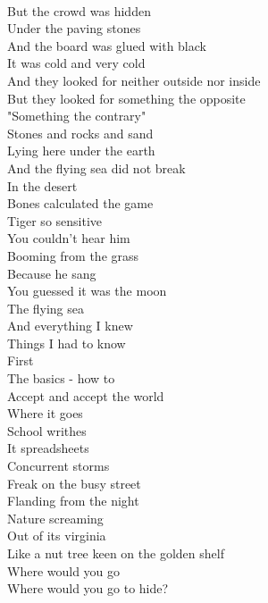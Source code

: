 \documentclass[smalldemyvopaper,11pt,twoside,onecolumn,openright,extrafontsizes]{memoir}
\begin{document}
\\But the crowd was hidden
\\Under the paving stones
\\And the board was glued with black
\\It was cold and very cold
\\And they looked for neither outside nor inside
\\But they looked for something the opposite
\\"Something the contrary"
\\Stones and rocks and sand
\\Lying here under the earth
\\And the flying sea did not break
\\In the desert
\\Bones calculated the game
\\Tiger so sensitive
\\You couldn't hear him
\\Booming from the grass
\\Because he sang
\\You guessed it was the moon
\\The flying sea
\\And everything I knew
\\Things I had to know
\\First
\\The basics - how to
\\Accept and accept the world
\\Where it goes
\\School writhes
\\It spreadsheets
\\Concurrent storms
\\Freak on the busy street
\\Flanding from the night
\\Nature screaming
\\Out of its virginia
\\Like a nut tree keen on the golden shelf
\\Where would you go
\\Where would you go to hide?
\end{document}
